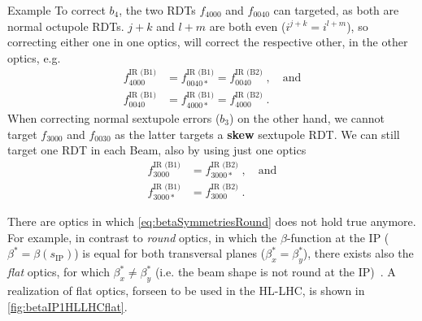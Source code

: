 \begin{important}
        \item[\color{BlackCat} Example] 
        To correct $b_4$, the two RDTs $f_{4000}$ and $f_{0040}$ can targeted,
        as both are normal octupole RDTs.
        $j+k$ and $l+m$ are both even ($i^{j+k} = i^{l+m}$), so correcting either one in one optics,
        will correct the respective other, in the other optics, e.g.
        \begin{equation}
        \begin{split}
            f^\text{IR (B1)}_{4000} &= f^\text{IR (B1)}_{0040*} = f^\text{IR (B2)}_{0040} \;, \quad \text{and} \\
            f^\text{IR (B1)}_{0040} &=  f^\text{IR (B1)}_{4000*} = f^\text{IR (B2)}_{4000} \;.
        \end{split}
        \end{equation}
        When correcting normal sextupole errors ($b_3$) on the other hand, we cannot target
        $f_{3000}$ and $f_{0030}$ as the latter targets a \textbf{skew} sextupole RDT.
        We can still target one RDT in each Beam, also by using just one optics 
        \begin{equation}
        \begin{split}
            f^\text{IR (B1)}_{3000} &= f^\text{IR (B2)}_{3000*} \;, \quad \text{and} \\
            f^\text{IR (B1)}_{3000*} &=  f^\text{IR (B2)}_{3000} \;.
        \end{split}
        \end{equation}
\end{important}

There are optics in which \cref{eq:betaSymmetriesRound} does not hold true anymore.
For example, in contrast to \textit{round} optics, 
in which the $\beta$-function  at the IP ($\beta^* = \beta(s_\text{IP})$) is equal for both transversal planes ($\beta^*_x = \beta^*_y$),
there exists also the \textit{flat} optics, for which $\beta^*_x \neq \beta^*_y$ 
(i.e. the beam shape is not round at the IP)~\cite{FartoukhAchromaticTelescopicSqueezing2013,FartoukhFlatTelescopicOptics2018}.
A realization of flat optics, forseen to be used in the HL-LHC, is shown in \cref{fig:betaIP1HLLHCflat}.

